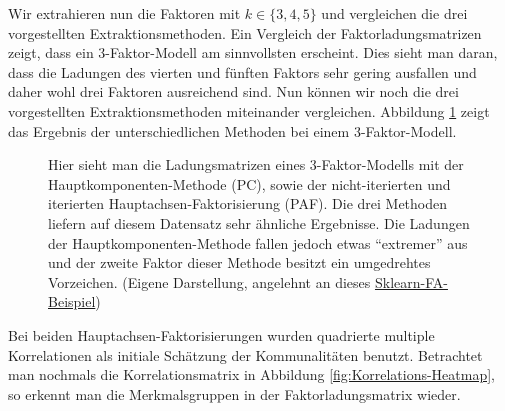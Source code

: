 \documentclass[11pt]{scrartcl}
\begin{document}
	Wir extrahieren nun die Faktoren mit $k \in \{3, 4, 5\}$ und vergleichen die drei vorgestellten Extraktionsmethoden.
	Ein Vergleich der Faktorladungsmatrizen zeigt, dass ein 3-Faktor-Modell am sinnvollsten erscheint. Dies sieht man daran, dass
	die Ladungen des vierten
	und fünften Faktors sehr gering ausfallen und daher wohl drei Faktoren ausreichend sind. Nun können wir noch die drei
	vorgestellten Extraktionsmethoden miteinander vergleichen.
	Abbildung \ref{fig:ladungsmatrix-drei-faktoren} zeigt das Ergebnis der unterschiedlichen
	Methoden bei einem 3-Faktor-Modell. 
	\begin{figure}[h]
		\centering
		
		\caption[Faktorladungsmatrizen mit drei Faktoren]{Hier sieht man die Ladungsmatrizen eines 3-Faktor-Modells mit der Hauptkomponenten-Methode (PC), sowie der nicht-iterierten 
		und iterierten Hauptachsen-Faktorisierung (PAF). Die drei Methoden liefern auf diesem Datensatz sehr ähnliche
		Ergebnisse. Die Ladungen der Hauptkomponenten-Methode fallen jedoch etwas \enquote{extremer} aus und der zweite Faktor dieser Methode besitzt ein umgedrehtes
		Vorzeichen. (Eigene Darstellung, angelehnt an dieses \href{https://scikit-learn.org/stable/auto_examples/decomposition/plot_varimax_fa.html\#sphx-glr-auto-examples-decomposition-plot-varimax-fa-py}{Sklearn-FA-Beispiel})}
		\label{fig:ladungsmatrix-drei-faktoren}
	\end{figure} 
	Bei beiden Hauptachsen-Faktorisierungen wurden quadrierte multiple Korrelationen
	als initiale Schätzung der Kommunalitäten benutzt.
	Betrachtet man nochmals die Korrelationsmatrix in Abbildung \ref{fig:Korrelations-Heatmap},
	so erkennt man die Merkmalsgruppen in der Faktorladungsmatrix wieder.
	
\end{document}
